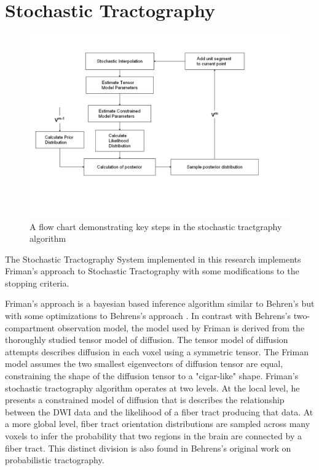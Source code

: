 \chapter{Stochastic Tractography}
\begin{figure} \label{fig:stflow}
	\includegraphics[width=\linewidth]{stflow}
	\caption{A flow chart demonstrating key steps in the stochastic tractgraphy algorithm}
\end{figure}
The Stochastic Tractography System implemented in this research implements Friman's \cite{frimanTMI06} approach to Stochastic Tractography with some modifications to the stopping criteria.

Friman's approach is a bayesian based inference algorithm similar to Behren's but with some optimizations to Behrens's approach \cite{frimanTMI06}.  In contrast with Behrens's two-compartment observation model, the model used by Friman is derived from the thoroughly studied tensor model of diffusion.  The tensor model of diffusion attempts describes diffusion in each voxel using a symmetric tensor.  The Friman model assumes the two smallest eigenvectors of diffusion tensor are equal, constraining the shape of the diffusion tensor to a "cigar-like" shape. 
Friman's stochastic tractography algorithm \cite{frimanTMI06} operates at two levels.  At the local level, he presents a constrained model of diffusion that is describes the relationship between the DWI data and the likelihood of a fiber tract producing that data.  At a more global level, fiber tract orientation distributions are sampled across many voxels to infer the probability that two regions in the brain are connected by a fiber tract.  This distinct division is also found in Behrens's original work \cite{behrensMRM03} on probabilistic tractography.



